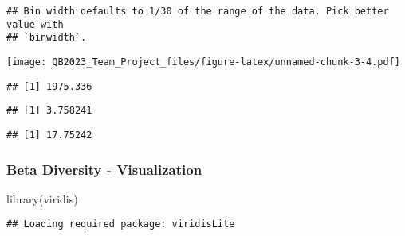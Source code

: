 \documentclass[
]{article}
\newenvironment{Shaded}{\begin{snugshade}}{\end{snugshade}}
\newcommand{\FunctionTok}[1]{\textcolor[rgb]{0.00,0.00,0.00}{#1}}
\newcommand{\NormalTok}[1]{#1}
\newcommand{\SpecialCharTok}[1]{\textcolor[rgb]{0.00,0.00,0.00}{#1}}
\begin{document}
\begin{verbatim}
## Bin width defaults to 1/30 of the range of the data. Pick better value with
## `binwidth`.
\end{verbatim}

\texttt{[image: QB2023\_Team\_Project\_files/figure-latex/unnamed-chunk-3-4.pdf]}

\begin{Shaded}
\end{Shaded}

\begin{verbatim}
## [1] 1975.336
\end{verbatim}

\begin{Shaded}
\end{Shaded}

\begin{verbatim}
## [1] 3.758241
\end{verbatim}

\begin{Shaded}
\end{Shaded}

\begin{verbatim}
## [1] 17.75242
\end{verbatim}

\hypertarget{beta-diversity---visualization}{%
\subsubsection{Beta Diversity -
Visualization}\label{beta-diversity---visualization}}

\begin{Shaded}
\begin{Highlighting}[]
\FunctionTok{library}\NormalTok{(viridis)}
\end{Highlighting}
\end{Shaded}

\begin{verbatim}
## Loading required package: viridisLite
\end{verbatim}
\end{document}

